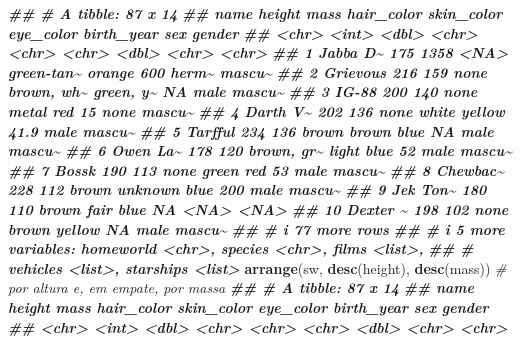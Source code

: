 \documentclass[
  portuguese,
  11pt,
  openany]{book}
\newenvironment{Shaded}{\begin{snugshade}}{\end{snugshade}}
\newcommand{\CommentTok}[1]{\textcolor[rgb]{0.56,0.35,0.01}{\textit{#1}}}
\newcommand{\DocumentationTok}[1]{\textcolor[rgb]{0.56,0.35,0.01}{\textbf{\textit{#1}}}}
\newcommand{\FunctionTok}[1]{\textcolor[rgb]{0.13,0.29,0.53}{\textbf{#1}}}
\newcommand{\NormalTok}[1]{#1}
\newcounter{none} %
\begin{document}
\begin{Shaded}
\begin{Highlighting}[]
\DocumentationTok{\#\# \# A tibble: 87 x 14}
\DocumentationTok{\#\#    name     height  mass hair\_color skin\_color eye\_color birth\_year sex   gender}
\DocumentationTok{\#\#    \textless{}chr\textgreater{}     \textless{}int\textgreater{} \textless{}dbl\textgreater{} \textless{}chr\textgreater{}      \textless{}chr\textgreater{}      \textless{}chr\textgreater{}          \textless{}dbl\textgreater{} \textless{}chr\textgreater{} \textless{}chr\textgreater{} }
\DocumentationTok{\#\#  1 Jabba D\textasciitilde{}    175  1358 \textless{}NA\textgreater{}       green{-}tan\textasciitilde{} orange         600   herm\textasciitilde{} mascu\textasciitilde{}}
\DocumentationTok{\#\#  2 Grievous    216   159 none       brown, wh\textasciitilde{} green, y\textasciitilde{}       NA   male  mascu\textasciitilde{}}
\DocumentationTok{\#\#  3 IG{-}88       200   140 none       metal      red             15   none  mascu\textasciitilde{}}
\DocumentationTok{\#\#  4 Darth V\textasciitilde{}    202   136 none       white      yellow          41.9 male  mascu\textasciitilde{}}
\DocumentationTok{\#\#  5 Tarfful     234   136 brown      brown      blue            NA   male  mascu\textasciitilde{}}
\DocumentationTok{\#\#  6 Owen La\textasciitilde{}    178   120 brown, gr\textasciitilde{} light      blue            52   male  mascu\textasciitilde{}}
\DocumentationTok{\#\#  7 Bossk       190   113 none       green      red             53   male  mascu\textasciitilde{}}
\DocumentationTok{\#\#  8 Chewbac\textasciitilde{}    228   112 brown      unknown    blue           200   male  mascu\textasciitilde{}}
\DocumentationTok{\#\#  9 Jek Ton\textasciitilde{}    180   110 brown      fair       blue            NA   \textless{}NA\textgreater{}  \textless{}NA\textgreater{}  }
\DocumentationTok{\#\# 10 Dexter \textasciitilde{}    198   102 none       brown      yellow          NA   male  mascu\textasciitilde{}}
\DocumentationTok{\#\# \# i 77 more rows}
\DocumentationTok{\#\# \# i 5 more variables: homeworld \textless{}chr\textgreater{}, species \textless{}chr\textgreater{}, films \textless{}list\textgreater{},}
\DocumentationTok{\#\# \#   vehicles \textless{}list\textgreater{}, starships \textless{}list\textgreater{}}
\FunctionTok{arrange}\NormalTok{(sw, }\FunctionTok{desc}\NormalTok{(height), }\FunctionTok{desc}\NormalTok{(mass))    }\CommentTok{\# por altura e, em empate, por massa}
\DocumentationTok{\#\# \# A tibble: 87 x 14}
\DocumentationTok{\#\#    name     height  mass hair\_color skin\_color eye\_color birth\_year sex   gender}
\DocumentationTok{\#\#    \textless{}chr\textgreater{}     \textless{}int\textgreater{} \textless{}dbl\textgreater{} \textless{}chr\textgreater{}      \textless{}chr\textgreater{}      \textless{}chr\textgreater{}          \textless{}dbl\textgreater{} \textless{}chr\textgreater{} \textless{}chr\textgreater{} }

\end{Highlighting}
\end{Shaded}
\end{document}

